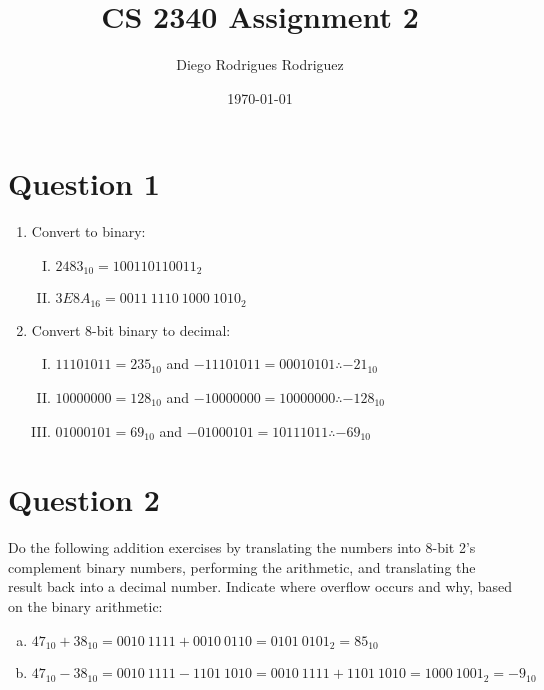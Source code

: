 \documentclass[12pt]{article}
\begin{document}
\title{CS 2340 Assignment 2}
\author{Diego Rodrigues Rodriguez}
\date{\today}
\maketitle

\section*{Question 1}
\begin{enumerate}
    \item Convert to binary:
        \begin{enumerate}[I.]
            \item $2483_{10} = 100110110011_2$
            \item $3E8A_{16} = 0011\ 1110\ 1000\ 1010_2$
    \end{enumerate}
    \item Convert 8-bit binary to decimal:
        \begin{enumerate}[I.]
            \item $11101011 = 235_{10}$ and $-11101011 = 00010101 \therefore -21_{10}$
            \item $10000000 = 128_{10}$ and $-10000000 = 10000000 \therefore -128_{10}$
            \item $01000101 = 69_{10}$ and $-01000101 = 10111011 \therefore -69_{10}$
        \end{enumerate}
\end{enumerate}

\section*{Question 2}
Do the following addition exercises by translating the numbers into 8-bit 2's complement binary
numbers, performing the arithmetic, and translating the result back into a decimal number.
Indicate where overflow occurs and why, based on the binary arithmetic:
\begin{enumerate}[a.]
    \item $47_{10} + 38_{10} = 0010\ 1111 + 0010\ 0110 = 0101\ 0101_{2} = 85_{10}$
    \item $47_{10} - 38_{10} = 0010\ 1111 - 1101\ 1010 = 0010\ 1111 + 1101\ 1010 = 1000\ 1001_{2} = -9_{10}$
\end{enumerate}
\end{document}
